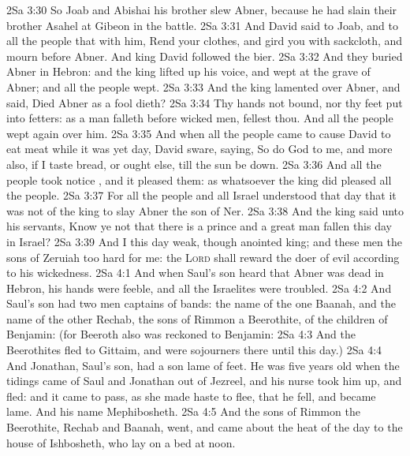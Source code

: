 \vs 2Sa 3:30 So Joab and Abishai his brother slew Abner, because he had slain their brother Asahel at Gibeon in the battle.
\vs 2Sa 3:31 And David said to Joab, and to all the people that  with him, Rend your clothes, and gird you with sackcloth, and mourn before Abner. And king David  followed the bier.
\vs 2Sa 3:32 And they buried Abner in Hebron: and the king lifted up his voice, and wept at the grave of Abner; and all the people wept.
\vs 2Sa 3:33 And the king lamented over Abner, and said, Died Abner as a fool dieth?
\vs 2Sa 3:34 Thy hands  not bound, nor thy feet put into fetters: as a man falleth before wicked men,  fellest thou. And all the people wept again over him.
\vs 2Sa 3:35 And when all the people came to cause David to eat meat while it was yet day, David sware, saying, So do God to me, and more also, if I taste bread, or ought else, till the sun be down.
\vs 2Sa 3:36 And all the people took notice , and it pleased them: as whatsoever the king did pleased all the people.
\vs 2Sa 3:37 For all the people and all Israel understood that day that it was not of the king to slay Abner the son of Ner.
\vs 2Sa 3:38 And the king said unto his servants, Know ye not that there is a prince and a great man fallen this day in Israel?
\vs 2Sa 3:39 And I  this day weak, though anointed king; and these men the sons of Zeruiah  too hard for me: the \textsc{Lord} shall reward the doer of evil according to his wickedness.
\vs 2Sa 4:1 And when Saul's son heard that Abner was dead in Hebron, his hands were feeble, and all the Israelites were troubled.
\vs 2Sa 4:2 And Saul's son had two men  captains of bands: the name of the one  Baanah, and the name of the other Rechab, the sons of Rimmon a Beerothite, of the children of Benjamin: (for Beeroth also was reckoned to Benjamin:
\vs 2Sa 4:3 And the Beerothites fled to Gittaim, and were sojourners there until this day.)
\vs 2Sa 4:4 And Jonathan, Saul's son, had a son  lame of  feet. He was five years old when the tidings came of Saul and Jonathan out of Jezreel, and his nurse took him up, and fled: and it came to pass, as she made haste to flee, that he fell, and became lame. And his name  Mephibosheth.
\vs 2Sa 4:5 And the sons of Rimmon the Beerothite, Rechab and Baanah, went, and came about the heat of the day to the house of Ishbosheth, who lay on a bed at noon.
